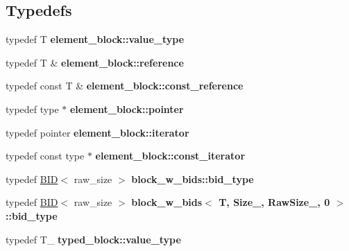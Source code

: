 \subsection*{Typedefs}
\begin{CompactItemize}
\item 
\hypertarget{group__mnglayer_gf4b942e8fd7f45f98e878658dd9d5eb3}{
typedef T \textbf{element\_\-block::value\_\-type}}
\label{group__mnglayer_gf4b942e8fd7f45f98e878658dd9d5eb3}

\item 
\hypertarget{group__mnglayer_g440dde951fbd48acb83efcb7eb146fb7}{
typedef T \& \textbf{element\_\-block::reference}}
\label{group__mnglayer_g440dde951fbd48acb83efcb7eb146fb7}

\item 
\hypertarget{group__mnglayer_gf5d43971860fb25f4cd591fe678bfc41}{
typedef const T \& \textbf{element\_\-block::const\_\-reference}}
\label{group__mnglayer_gf5d43971860fb25f4cd591fe678bfc41}

\item 
\hypertarget{group__mnglayer_g0a2a1c6bc4bdad79df97c4fea68524b8}{
typedef type $\ast$ \textbf{element\_\-block::pointer}}
\label{group__mnglayer_g0a2a1c6bc4bdad79df97c4fea68524b8}

\item 
\hypertarget{group__mnglayer_gc468b1fa2d879f091debc2d9fe0b329e}{
typedef pointer \textbf{element\_\-block::iterator}}
\label{group__mnglayer_gc468b1fa2d879f091debc2d9fe0b329e}

\item 
\hypertarget{group__mnglayer_g0e51dca212a92bf8fe8f0ab48d93e915}{
typedef const type $\ast$ \textbf{element\_\-block::const\_\-iterator}}
\label{group__mnglayer_g0e51dca212a92bf8fe8f0ab48d93e915}

\item 
\hypertarget{group__mnglayer_g3418b30447bfa7129dabe6682e1df1a7}{
typedef \hyperlink{structBID}{BID}$<$ raw\_\-size $>$ \textbf{block\_\-w\_\-bids::bid\_\-type}}
\label{group__mnglayer_g3418b30447bfa7129dabe6682e1df1a7}

\item 
\hypertarget{group__mnglayer_g6dfb1d3d8bff999ef94b07018d641552}{
typedef \hyperlink{structBID}{BID}$<$ raw\_\-size $>$ \textbf{block\_\-w\_\-bids$<$ T, Size\_\-, RawSize\_\-, 0 $>$::bid\_\-type}}
\label{group__mnglayer_g6dfb1d3d8bff999ef94b07018d641552}

\item 
\hypertarget{group__mnglayer_g7f42e0c3e742cf3733e0d5592d54ab58}{
typedef T\_\- \textbf{typed\_\-block::value\_\-type}}
\label{group__mnglayer_g7f42e0c3e742cf3733e0d5592d54ab58}


\end{CompactItemize}
